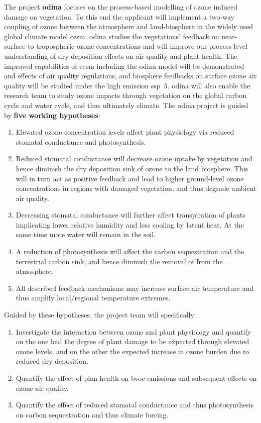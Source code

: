 
The project \textbf{\gls{odina}} focuses on the process-based modelling of ozone induced damage on vegetation. To this end the applicant will implement a two-way coupling of ozone between the atmosphere and land-biosphere in the widely used global climate model \gls{cesm}. \gls{odina} studies the vegetations' feedback on near-surface to tropospheric ozone concentrations and will improve our process-level understanding of dry deposition effects on air quality and plant health. The improved capabilities of \gls{cesm} including the \gls{odina} model will be demonstrated and effects of air quality regulations, and biosphere feedbacks on surface ozone air quality will be studied under the high emission \gls{ssp}~5. \gls{odina} will also enable the research team to study ozone impacts through vegetation on the global carbon cycle and water cycle, and thus ultimately climate.
The \gls{odina} project is guided by \textbf{five working hypotheses}: 

\begin{enumerate}
\itemsep0pt
\item Elevated ozone concentration levels affect plant physiology via reduced stomatal conductance and photosynthesis. 
\item Reduced stomatal conductance will decrease ozone uptake by vegetation and hence diminish the dry deposition sink of ozone to the land biosphere. This will in turn act as positive feedback and lead to higher ground-level ozone concentrations in regions with damaged vegetation, and thus degrade ambient air quality.
\item Decreasing stomatal conductance will further affect transpiration of plants implicating lower relative humidity and less cooling by latent heat. At the same time more water will remain in the soil.
\item A reduction of photosynthesis will affect the carbon sequestration and the terrestrial carbon sink, and hence diminish the removal of  from the atmosphere.
\item All described feedback mechanisms may increase surface air temperature and thus amplify local/regional temperature extremes.
\end{enumerate}

Guided by these hypotheses, the project team will specifically:
\begin{enumerate}
\itemsep0pt
\item Investigate the interaction between ozone and plant physiology and quantify on the one had the degree of plant damage to be expected through elevated ozone levels, and on the other the expected increase in ozone burden due to reduced dry deposition.
\item Quantify the effect of plan health on \gls{bvoc} emissions and subsequent effects on ozone air quality.
\item Quantify the effect of reduced stomatal conductance and thus photosynthesis on carbon sequestration and thus climate forcing.
\end{enumerate}

